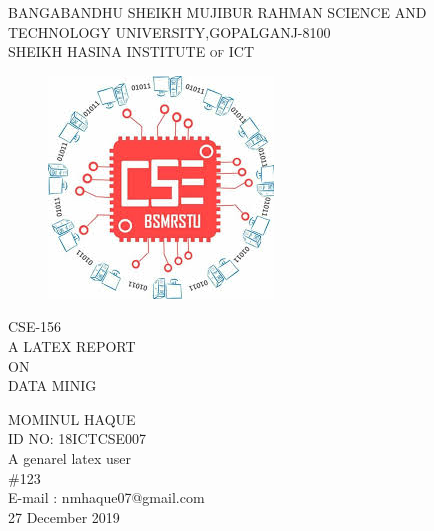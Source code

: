 \documentclass{article}
\begin{document}
\begin{titlepage}

\begin{center}
\huge{\small BANGABANDHU SHEIKH MUJIBUR RAHMAN SCIENCE AND TECHNOLOGY UNIVERSITY,GOPALGANJ-8100}\\
[1mm]

\textsc{\small  SHEIKH HASINA INSTITUTE of ICT}\\

\end{center}
\begin{figure}[H]
\centering
\includegraphics[height=4.00in•]{downloadbsmrstucse.jpg}
\\
\end{figure}
\begin{center}
\textsc{\large CSE-156}\\
A LATEX REPORT\\ ON\\
\textsc{\large DATA MINIG}\\
\end{center}

\begin{flushright}

\textsc{MOMINUL HAQUE\\}
ID NO: 18ICTCSE007\\
A genarel latex user\\
\#123\\
E-mail : nmhaque07@gmail.com\\
27 December 2019


\end{flushright}

\end{titlepage}
\end{document}
